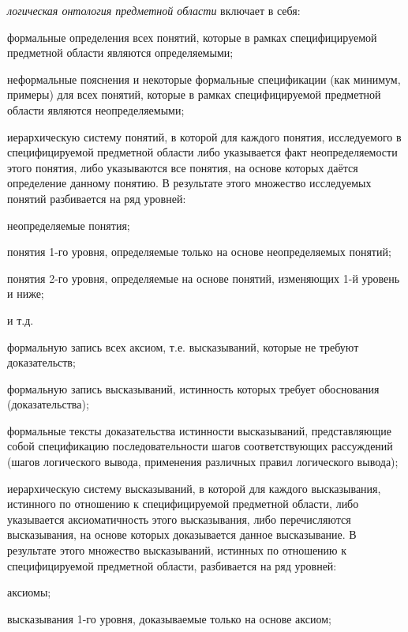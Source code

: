 \textit{логическая онтология предметной области} включает в себя:
\begin{textitemize}
	\item формальные определения всех понятий, которые в рамках специфицируемой предметной области являются определяемыми;
	\item неформальные пояснения и некоторые формальные спецификации (как минимум, примеры) для всех понятий, которые в рамках специфицируемой предметной области являются неопределяемыми;
	\item иерархическую систему понятий, в которой для каждого понятия, исследуемого в специфицируемой предметной области либо указывается факт неопределяемости этого понятия, либо указываются все понятия, на основе которых даётся определение данному понятию.
	В результате этого множество исследуемых понятий разбивается на ряд уровней: 
	\begin{textitemize}
		\item неопределяемые понятия;
		\item понятия 1-го уровня, определяемые только на основе неопределяемых понятий;
		\item понятия 2-го уровня, определяемые на основе понятий, изменяющих 1-й уровень и ниже;
		\item и т.д.
	\end{textitemize}
	\item формальную запись всех аксиом, т.е. высказываний, которые не требуют доказательств;
	\item формальную запись высказываний, истинность которых требует обоснования (доказательства);
	\item формальные тексты доказательства истинности высказываний, представляющие собой спецификацию последовательности шагов соответствующих рассуждений (шагов логического вывода, применения различных правил логического вывода);
	\item иерархическую систему высказываний, в которой для каждого высказывания, истинного по отношению к специфицируемой предметной области, либо указывается аксиоматичность этого высказывания, либо перечисляются  высказывания, на основе которых доказывается данное высказывание. В результате этого множество высказываний, истинных по отношению к специфицируемой предметной области, разбивается на ряд уровней:
	\begin{textitemize}
		\item аксиомы;
		\item высказывания 1-го уровня, доказываемые только на основе аксиом;

\end{textitemize}
\end{textitemize}
